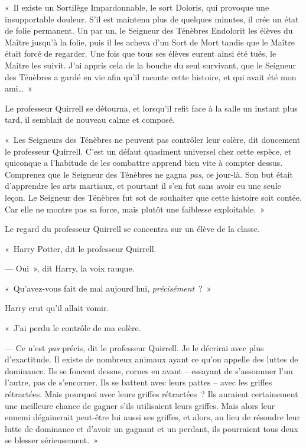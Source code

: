 «~Il existe un Sortilège Impardonnable, le sort Doloris, qui provoque une insupportable douleur.
S'il est maintenu plus de quelques minutes, il crée un état de folie permanent.
Un par un, le Seigneur des Ténèbres Endolorit les élèves du Maître jusqu'à la folie, puis il les acheva d'un Sort de Mort tandis que le Maître était forcé de regarder.
Une fois que tous ses élèves eurent ainsi été tués, le Maître les suivit.
J'ai appris cela de la bouche du seul survivant, que le Seigneur des Ténèbres a gardé en vie afin qu'il raconte cette histoire, et qui avait été mon ami…~»

Le professeur Quirrell se détourna, et lorsqu'il refit face à la salle un instant plus tard, il semblait de nouveau calme et composé.

«~Les Seigneurs des Ténèbres ne peuvent pas contrôler leur colère, dit doucement le professeur Quirrell.
C'est un défaut quasiment universel chez cette espèce, et quiconque a l'habitude de les combattre apprend bien vite à compter dessus.
Comprenez que le Seigneur des Ténèbres ne gagna \emph{pas}, ce jour-là.
Son but était d'apprendre les arts martiaux, et pourtant il s'en fut sans avoir eu une seule leçon.
Le Seigneur des Ténèbres fut sot de souhaiter que cette histoire soit contée.
Car elle ne montre pas sa force, mais plutôt une faiblesse exploitable.~»

Le regard du professeur Quirrell se concentra sur un élève de la classe.

«~Harry Potter, dit le professeur Quirrell.

--- Oui~», dit Harry, la voix rauque.

«~Qu'avez-vous fait de mal aujourd'hui, \emph{précisément}~?~»

Harry crut qu'il allait vomir.

«~J'ai perdu le contrôle de ma colère.

--- Ce n'est \emph{pas} précis, dit le professeur Quirrell.
Je le décrirai avec plus d'exactitude.
Il existe de nombreux animaux ayant ce qu'on appelle des luttes de dominance.
Ils se foncent dessus, cornes en avant -- essayant de s'assommer l'un l'autre, pas de s'encorner.
Ils se battent avec leurs pattes -- avec les griffes rétractées.
Mais pourquoi avec leurs griffes rétractées~?
Ils auraient certainement une meilleure chance de gagner s'ils utilisaient leurs griffes.
Mais alors leur ennemi dégainerait peut-être lui aussi ses griffes, et alors, au lieu de résoudre leur lutte de dominance et d'avoir un gagnant et un perdant, ils pourraient tous deux se blesser sérieusement.~»

